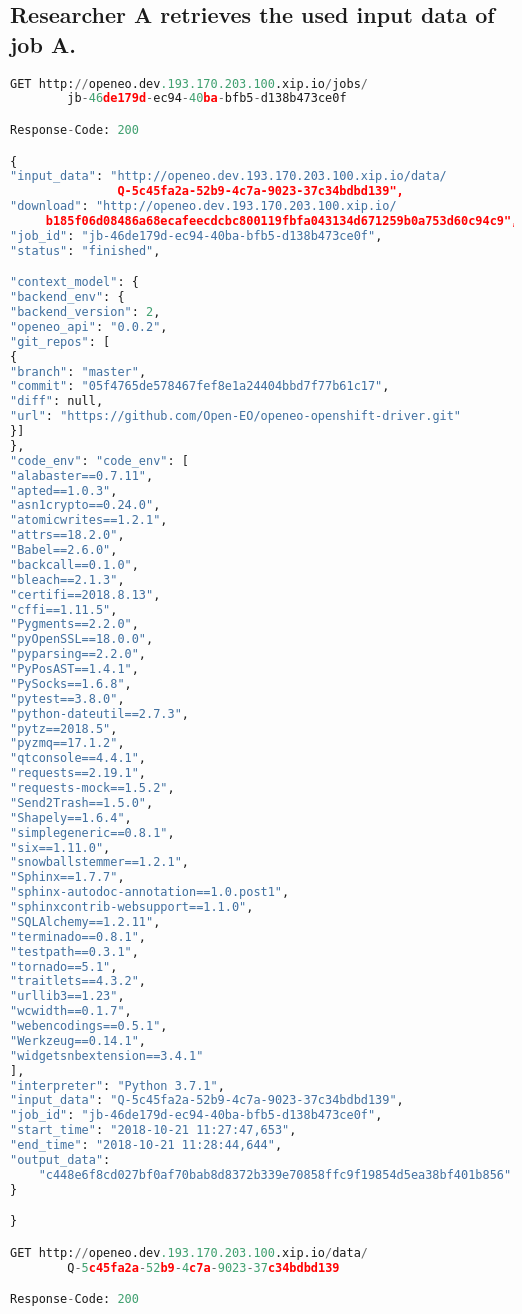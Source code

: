 \documentclass[draft,final]{vutinfth} %
\begin{document}
\subsection{Researcher A retrieves the used input data of job A.}
\begin{lstlisting}[frame=single, language=Python]
GET http://openeo.dev.193.170.203.100.xip.io/jobs/
		jb-46de179d-ec94-40ba-bfb5-d138b473ce0f

Response-Code: 200

{
"input_data": "http://openeo.dev.193.170.203.100.xip.io/data/
               Q-5c45fa2a-52b9-4c7a-9023-37c34bdbd139",
"download": "http://openeo.dev.193.170.203.100.xip.io/
     b185f06d08486a68ecafeecdcbc800119fbfa043134d671259b0a753d60c94c9", 
"job_id": "jb-46de179d-ec94-40ba-bfb5-d138b473ce0f",
"status": "finished",

"context_model": {
"backend_env": {
"backend_version": 2,
"openeo_api": "0.0.2",
"git_repos": [
{
"branch": "master",
"commit": "05f4765de578467fef8e1a24404bbd7f77b61c17",
"diff": null,
"url": "https://github.com/Open-EO/openeo-openshift-driver.git"
}]
},
"code_env": "code_env": [
"alabaster==0.7.11",
"apted==1.0.3",
"asn1crypto==0.24.0",
"atomicwrites==1.2.1",
"attrs==18.2.0",
"Babel==2.6.0",
"backcall==0.1.0",
"bleach==2.1.3",
"certifi==2018.8.13",
"cffi==1.11.5",
"Pygments==2.2.0",
"pyOpenSSL==18.0.0",
"pyparsing==2.2.0",
"PyPosAST==1.4.1",
"PySocks==1.6.8",
"pytest==3.8.0",
"python-dateutil==2.7.3",
"pytz==2018.5",
"pyzmq==17.1.2",
"qtconsole==4.4.1",
"requests==2.19.1",
"requests-mock==1.5.2",
"Send2Trash==1.5.0",
"Shapely==1.6.4",
"simplegeneric==0.8.1",
"six==1.11.0",
"snowballstemmer==1.2.1",
"Sphinx==1.7.7",
"sphinx-autodoc-annotation==1.0.post1",
"sphinxcontrib-websupport==1.1.0",
"SQLAlchemy==1.2.11",
"terminado==0.8.1",
"testpath==0.3.1",
"tornado==5.1",
"traitlets==4.3.2",
"urllib3==1.23",
"wcwidth==0.1.7",
"webencodings==0.5.1",
"Werkzeug==0.14.1",
"widgetsnbextension==3.4.1"
],
"interpreter": "Python 3.7.1",
"input_data": "Q-5c45fa2a-52b9-4c7a-9023-37c34bdbd139",
"job_id": "jb-46de179d-ec94-40ba-bfb5-d138b473ce0f",
"start_time": "2018-10-21 11:27:47,653",
"end_time": "2018-10-21 11:28:44,644",
"output_data": 
	"c448e6f8cd027bf0af70bab8d8372b339e70858ffc9f19854d5ea38bf401b856"
}

}

GET http://openeo.dev.193.170.203.100.xip.io/data/
		Q-5c45fa2a-52b9-4c7a-9023-37c34bdbd139

Response-Code: 200


\end{lstlisting}
\end{document}
